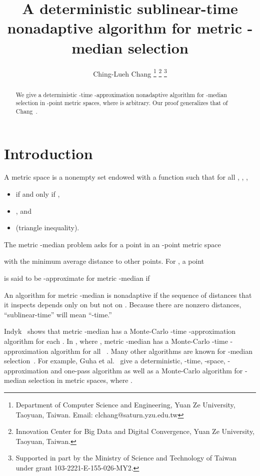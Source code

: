 \documentclass[letterpaper,12pt]{article}
\begin{document}
\title{A deterministic sublinear-time
nonadaptive
algorithm for metric
-median selection}

\author{
Ching-Lueh Chang \footnote{Department of Computer Science and
Engineering,
Yuan Ze University, Taoyuan, Taiwan. Email:
clchang@saturn.yzu.edu.tw}
\footnote{Innovation Center for Big Data and Digital Convergence,
Yuan Ze University, Taoyuan, Taiwan.}
\footnote{Supported in part by the Ministry of Science and Technology
of Taiwan under
grant
103-2221-E-155-026-MY2.}
}


\maketitle

\begin{abstract}
We
give
a deterministic -time -approximation
nonadaptive
algorithm for -median selection in
-point metric
spaces,
where
 is arbitrary.
Our proof generalizes that of Chang~\cite{Cha13}.
\end{abstract}


\section{Introduction}

A metric space  is a nonempty set 
endowed with a function  such that
for all , , ,
\begin{itemize}
\item  if and only if ,
\item ,
and
\item  (triangle inequality).
\end{itemize}
The
{\sc metric -median}
problem asks for a point in
an -point
metric space

with the minimum average distance to other points.
For ,
a point

is said to be -approximate for {\sc metric -median} if

An algorithm for {\sc metric -median} is nonadaptive
if the sequence of distances that it inspects
depends only on  but not on .
Because there are  nonzero distances,
``sublinear-time'' will mean ``-time.''



Indyk~\cite{Ind99, Ind00} shows that {\sc metric -median} has a
Monte-Carlo -time -approximation algorithm
for each .
In ,
where ,
{\sc metric -median} has a
Monte-Carlo -time
-approximation algorithm for all ~\cite{KSS10}.
Many other algorithms are known for -median
selection~\cite{GMMMO03, KSS10, ABS10}.
For example,
Guha et al.~\cite{GMMMO03}
give
a deterministic, -time, -space,
-approximation
and one-pass
algorithm as well as a Monte-Carlo algorithm for -median
selection in metric spaces, where .
\end{document}
